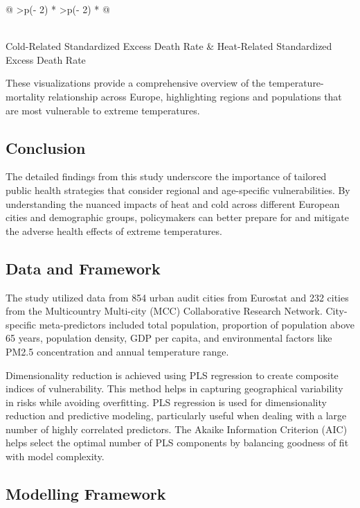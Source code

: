 \documentclass[
]{krantz}
\begin{document}
\begin{longtable}[]{@{}
  >{\centering\arraybackslash}p{(\columnwidth - 2\tabcolsep) * }
  >{\centering\arraybackslash}p{(\columnwidth - 2\tabcolsep) * }@{}}
\begin{minipage}[b]{\linewidth}
\end{minipage} \\
\midrule\noalign{}
\endhead
\bottomrule\noalign{}
\endlastfoot
Cold-Related Standardized Excess Death Rate & Heat-Related Standardized Excess Death Rate \\
\end{longtable}

These visualizations provide a comprehensive overview of the temperature-mortality relationship across Europe, highlighting regions and populations that are most vulnerable to extreme temperatures.

\subsection{Conclusion}\label{conclusion-4}

The detailed findings from this study underscore the importance of tailored public health strategies that consider regional and age-specific vulnerabilities. By understanding the nuanced impacts of heat and cold across different European cities and demographic groups, policymakers can better prepare for and mitigate the adverse health effects of extreme temperatures.

\subsection{Data and Framework}\label{data-and-framework}

The study utilized data from 854 urban audit cities from Eurostat and 232 cities from the Multicountry Multi-city (MCC) Collaborative Research Network. City-specific meta-predictors included total population, proportion of population above 65 years, population density, GDP per capita, and environmental factors like PM2.5 concentration and annual temperature range.

Dimensionality reduction is achieved using PLS regression to create composite indices of vulnerability. This method helps in capturing geographical variability in risks while avoiding overfitting. PLS regression is used for dimensionality reduction and predictive modeling, particularly useful when dealing with a large number of highly correlated predictors. The Akaike Information Criterion (AIC) helps select the optimal number of PLS components by balancing goodness of fit with model complexity.

\subsection{Modelling Framework}\label{modelling-framework}
\end{document}
